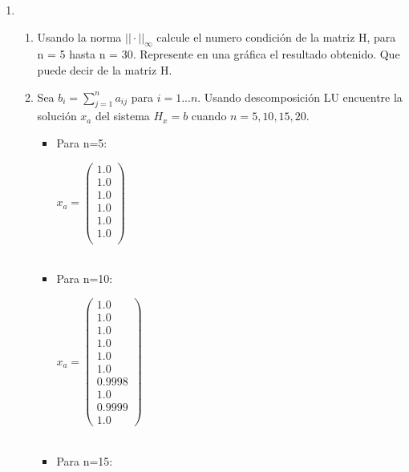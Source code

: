 \documentclass{udpreport}
\begin{document}
 \begin{enumerate}
 	\item   
 		\begin{enumerate}
 			\item 	Usando la norma $|| · ||_{\infty}$ calcule el numero condición de la matriz H, para n = 5 hasta n = 30.
Represente en una gráfica el resultado obtenido. Que puede decir de la matriz H.
 			
 			\item Sea $b_{i} = \sum_{j=1}^n a_{ij}$ para $i = 1...n$. Usando descomposición LU encuentre la solución $x_{a}$ del
sistema $H_{x} = b$ cuando $n = 5, 10, 15, 20$.
 				\begin{itemize} 				
 				\item Para n=5:
 				
 				$x_{a} = \left(\begin{array}{c} 1.0\\ 1.0\\ 1.0\\ 1.0\\ 1.0\\ 1.0\\ \end{array}\right)$
 				\\
 				\\
 				\item Para n=10:
 				
 				$x_{a} = \left(\begin{array}{c} 1.0\\ 1.0\\ 1.0\\ 1.0\\ 1.0\\ 1.0\\ 0.9998\\ 1.0\\ 0.9999\\ 1.0 \end{array}\right)$
 				\\
 				\\
 				\item Para n=15:
 				

\end{itemize}
\end{enumerate}
\end{enumerate}
\end{document}
